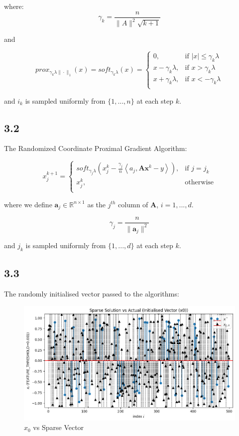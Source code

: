\documentclass[12pt]{article}
\begin{document}
where:
\[\gamma_k = \frac{n}{\|A\|^2 \sqrt{k+1}}\]

and

\[prox_{\gamma_k \lambda \|\cdot\|_1}(x) = soft_{\gamma_k \lambda}(x) = \begin{cases}
      0, &  \text{if } |x| \leq \gamma_k \lambda \\
      x-\gamma_k \lambda, & \text{if } x > \gamma_k \lambda \\
      x+\gamma_k \lambda, & \text{if } x < - \gamma_k \lambda \\
   \end{cases}\]

and $i_k$ is sampled uniformly from $\{1, ..., n\}$ at each step $k$.

\subsection*{3.2}

The Randomized Coordinate Proximal Gradient Algorithm:

\[x_j^{k+1} = \begin{cases}
      soft_{\gamma_j \lambda}(x_j^k - \frac{\gamma_j}{n} \left\langle a_j, \textbf{A} \textbf{x}^k - y\right\rangle), & \text{if } j = j_k \\
      x_j^k, & \text{otherwise} \\
   \end{cases}
\]

where we define $\textbf{a}_j \in \mathbb{R}^{n \times 1}$ as the $j^{th}$ column of $\textbf{A}$, $i=1, ..., d$.

\[\gamma_j = \frac{n}{\|\textbf{a}_j\|^2}\]

and $j_k$ is sampled uniformly from $\{1, ..., d\}$ at each step $k$.

\newpage
\subsection*{3.3}

The randomly initialised vector passed to the algorithms:

\begin{figure}[h]
\centering
\includegraphics[scale=0.35]{outputs/part_3/initial-x}
\caption{$x_0$ vs Sparse Vector}
\label{fig:}
\end{figure}
\end{document}
